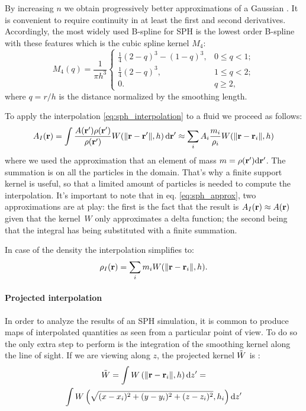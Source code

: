 By increasing $n$ we obtain progressively better approximations of a Gaussian \citep[see Section 13.3 of][]{Easton2010}.
It is convenient to require continuity in at least the first and second derivatives.
Accordingly, the most widely used B-spline for SPH is the lowest order B-spline with these features which is the cubic spline kernel $M_4$:
\begin{equation}
M_4(q) = \frac{1}{\pi h^3} \left\{
\begin{array}{ll}
\frac{1}{4}(2-q)^3 - (1 - q)^{3}, & 0 \le q < 1; \\[1ex]
\frac{1}{4}(2-q)^3, & 1 \le q < 2; \\[1ex]
0. & q \ge 2,
\end{array}
\right.
\label{eq:cubicspline}
\end{equation}
where $q=r/h$ is the distance normalized by the smoothing length.

To apply the interpolation \eqref{eq:sph_interpolation} to a fluid we proceed as follows:
\begin{equation}
A_I(\boldsymbol{\mathbf{r}}) = \int \frac{A(\boldsymbol{\mathbf{r}}')\rho(\boldsymbol{\mathbf{r}}')}{\rho(\boldsymbol{\mathbf{r}}')} W(\norm{\boldsymbol{\mathbf{r}} - \boldsymbol{\mathbf{r}}'},h)\, \dd\boldsymbol{\mathbf{r}}' \approx
\sum_i A_i\frac{m_i}{\rho_i} W(\norm{\boldsymbol{\mathbf{r}} - \boldsymbol{\mathbf{r}}_i},h)
\label{eq:sph_approx}
\end{equation}
where we used the approximation that an element of mass $m = \rho(\boldsymbol{\mathbf{r}}') \dd\boldsymbol{\mathbf{r}}'$.
The summation is on all the particles in the domain.
That's why a finite support kernel is useful, so that a limited amount of particles is needed to compute the interpolation.
It's important to note that in eq. \eqref{eq:sph_approx}, two approximations are at play:
the first is the fact that the result is $A_I(\boldsymbol{\mathbf{r}}) \approx A(\boldsymbol{\mathbf{r}})$ given that the kernel~$W$ only approximates a delta function; the second being that the integral has being substituted with a finite summation.

In case of the density the interpolation simplifies to:
\begin{equation}
  \rho_I(\boldsymbol{\mathbf{r}}) = \sum_i m_i W(\norm{\boldsymbol{\mathbf{r}} - \boldsymbol{\mathbf{r}}_i},h).
\end{equation}

\paragraph{Projected interpolation}
In order to analyze the results of an SPH simulation, it is common to produce maps of interpolated quantities as seen from a particular point of view.
To do so the only extra step to perform is the integration of the smoothing kernel along the line of sight.
If we are viewing along $z$, the projected kernel $\Tilde W$ is :
\begin{multline}
  \tilde W  = \int W \left(\norm{\vect{r} - \vect{r}_i},h \right) \dd z' =\\
   \int W \left(\sqrt{(x-x_i)^2+(y-y_i)^2+(z-z_i)^2}, h_i \right) \dd z' %
\label{eq:projected_kernel}
\end{multline}

